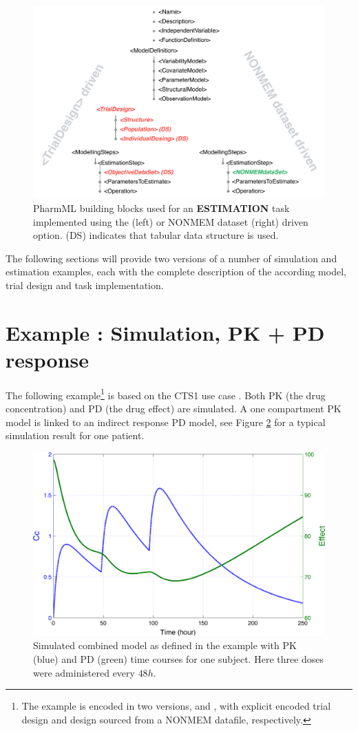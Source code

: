 \begin{figure}[htb!]
 \centering	
 \includegraphics[width=.8\linewidth]{pics/EstimationTask}%
 \caption{PharmML building blocks used for an \textbf{ESTIMATION} task implemented 
 using the  (left) or NONMEM dataset (right) driven option. 
(DS) indicates that tabular data structure is used.}
 \label{fig:EstimationTask_List}
 \end{figure}
The following sections will provide two versions of a number of simulation and estimation 
examples, each with the complete description of the according model, trial design 
and task implementation. 

\section{Example \theexamples: Simulation, PK + PD response}
\label{sec:eg1}

The following example\footnote{The example is encoded in two versions,  
 and , with explicit encoded trial 
design and design sourced from a NONMEM datafile, respectively.} is 
based on the CTS1 use case \cite{Lavielle:2011}. Both PK (the drug 
concentration) and PD (the drug effect) are simulated. A one compartment 
PK model is linked to an indirect response PD model, see Figure 
\ref{fig:simplePKPD} for a typical simulation result for one patient.

\begin{figure}[ht!]
\begin{center}
\includegraphics[width=.45\textwidth]{pics/CTS1_smallPKPD}
\caption{Simulated combined model as defined in the example with PK (blue) and PD (green) time courses for one subject. Here three doses were administered every $48h$.}
\label{fig:simplePKPD}
\vspace{-20pt}
\end{center}
\end{figure}

